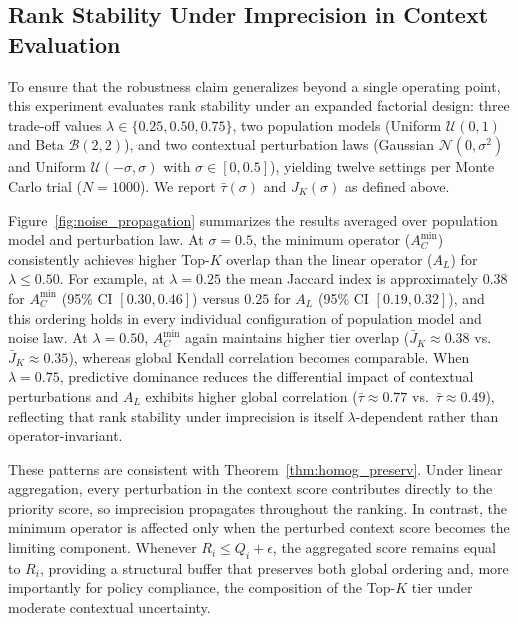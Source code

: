 \documentclass[mathematics,article,submit,moreauthors]{Definitions/mdpi}
\begin{document}
{\color{red}
\subsection{Rank Stability Under Imprecision in Context Evaluation}
\label{subsect:noise}

To ensure that the robustness claim generalizes beyond a single operating point, this experiment evaluates rank stability under an expanded factorial design: three trade-off values $\lambda\in\{0.25,0.50,0.75\}$, two population models (Uniform $\mathcal{U}(0,1)$ and Beta $\mathcal{B}(2,2)$), and two contextual perturbation laws (Gaussian $\mathcal{N}(0,\sigma^2)$ and Uniform $\mathcal{U}(-\sigma,\sigma)$ with $\sigma\in[0,0.5]$), yielding twelve settings per Monte Carlo trial ($N=1000$). We report $\bar{\tau}(\sigma)$ and $J_K(\sigma)$ as defined above.

Figure~\ref{fig:noise_propagation} summarizes the results averaged over population model and perturbation law. At $\sigma=0.5$, the minimum operator ($A_C^{\min}$) consistently achieves higher Top-$K$ overlap than the linear operator ($A_L$) for $\lambda\le 0.50$. For example, at $\lambda=0.25$ the mean Jaccard index is approximately $0.38$ for $A_C^{\min}$ (95\% CI $[0.30,0.46]$) versus $0.25$ for $A_L$ (95\% CI $[0.19,0.32]$), and this ordering holds in every individual configuration of population model and noise law. At $\lambda=0.50$, $A_C^{\min}$ again maintains higher tier overlap ($\bar{J}_K\approx 0.38$ vs.\ $\bar{J}_K\approx 0.35$), whereas global Kendall correlation becomes comparable. When $\lambda=0.75$, predictive dominance reduces the differential impact of contextual perturbations and $A_L$ exhibits higher global correlation ($\bar{\tau}\approx 0.77$ vs.\ $\bar{\tau}\approx 0.49$), reflecting that rank stability under imprecision is itself $\lambda$-dependent rather than operator-invariant.

These patterns are consistent with Theorem~\ref{thm:homog_preserv}. Under linear aggregation, every perturbation in the context score contributes directly to the priority score, so imprecision propagates throughout the ranking. In contrast, the minimum operator is affected only when the perturbed context score becomes the limiting component. Whenever $R_i\le Q_i+\epsilon$, the aggregated score remains equal to $R_i$, providing a structural buffer that preserves both global ordering and, more importantly for policy compliance, the composition of the Top-$K$ tier under moderate contextual uncertainty.

}
\end{document}
